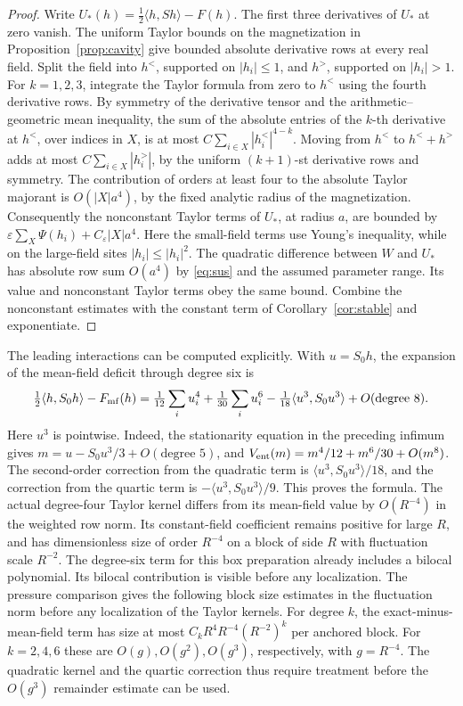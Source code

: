 \documentclass[11pt]{article}
\begin{document}
\begin{proof}
Write \(U_*(h)=\frac12\langle h,Sh\rangle-F(h)\).
The first three derivatives of \(U_*\) at zero vanish.
The uniform Taylor bounds on the magnetization in
Proposition~\ref{prop:cavity} give bounded absolute derivative rows
at every real field. Split the field into \(h^{<}\), supported on
\(|h_i|\le1\), and \(h^{>}\), supported on \(|h_i|>1\).
For \(k=1,2,3\), integrate the Taylor formula from zero to \(h^{<}\)
using the fourth derivative rows. By symmetry of the derivative
tensor and the arithmetic--geometric mean inequality, the sum
of the absolute entries of the \(k\)-th derivative at \(h^{<}\),
over indices in \(X\), is at most
\(C\sum_{i\in X}|h_i^{<}|^{4-k}\).
Moving from \(h^{<}\) to \(h^{<}+h^{>}\) adds at most
\(C\sum_{i\in X}|h_i^{>}|\), by the uniform \((k+1)\)-st derivative
rows and symmetry. The contribution of orders at least four
to the absolute Taylor majorant is \(O(|X|a^4)\), by the fixed
analytic radius of the magnetization. Consequently the
nonconstant Taylor terms of \(U_*\), at radius \(a\), are bounded
by \(\varepsilon\sum_X\Psi(h_i)+C_\varepsilon|X|a^4\).
Here the small-field terms use Young's inequality, while on
the large-field sites \(|h_i|\le |h_i|^2\).
The quadratic difference between \(W\) and \(U_*\) has absolute
row sum \(O(a^4)\) by \eqref{eq:sus} and the assumed parameter range.
Its value and nonconstant Taylor terms obey the same bound.
Combine the nonconstant estimates with the constant term of
Corollary~\ref{cor:stable} and exponentiate.
\end{proof}

The leading interactions can be computed explicitly. With \(u=S_0h\),
the expansion of the mean-field deficit through degree six is
\begin{equation}\label{eq:entsextic}
 \tfrac12\langle h,S_0h\rangle-F_{\rm mf}(h)
  =\tfrac1{12}\sum_i u_i^4+\tfrac1{30}\sum_i u_i^6
          -\tfrac1{18}\langle u^3,S_0u^3\rangle
          +O(\text{degree }8).
\end{equation}
Here \(u^3\) is pointwise. Indeed, the stationarity equation in the
preceding infimum gives \(m=u-S_0u^3/3+O(\text{degree }5)\), and
\(V_{\rm ent}(m)=m^4/12+m^6/30+O(m^8)\). The second-order correction
from the quadratic term is \(\langle u^3,S_0u^3\rangle/18\), and
the correction from the quartic term is
\(-\langle u^3,S_0u^3\rangle/9\). This proves the formula.
The actual degree-four Taylor kernel differs from its mean-field
value by \(O(R^{-4})\) in the weighted row norm. Its constant-field
coefficient remains positive for large \(R\), and has dimensionless
size of order \(R^{-4}\) on a block of side \(R\) with fluctuation
scale \(R^{-2}\). The degree-six term for this box preparation
already includes a bilocal polynomial. Its bilocal contribution is visible before any localization. The
pressure comparison gives the following block size estimates in
the fluctuation norm before any localization of the Taylor kernels.
For degree \(k\), the exact-minus-mean-field term has size at most
\(C_k R^4R^{-4}(R^{-2})^k\) per anchored block. For \(k=2,4,6\)
these are \(O(g),O(g^2),O(g^3)\), respectively, with
\(g=R^{-4}\). The quadratic kernel and the quartic correction thus
require treatment before the \(O(g^3)\) remainder estimate can be used.
\end{document}

